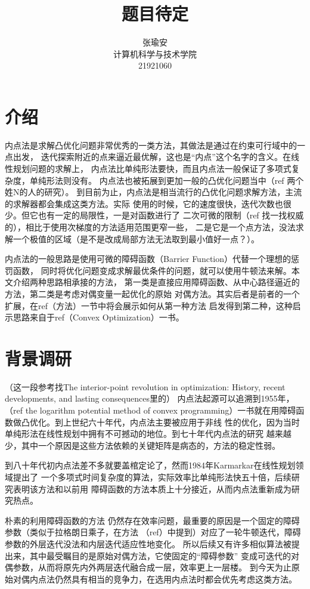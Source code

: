 \documentclass{article}
\title{题目待定}
\author{张瑜安\\ 计算机科学与技术学院 \\21921060}
\date{}
\begin{document}
\maketitle
\section{介绍}
内点法是求解凸优化问题非常优秀的一类方法，其做法是通过在约束可行域中的一点出发，
迭代探索附近的点来逼近最优解，这也是“内点”这个名字的含义。在线性规划问题的求解上，
内点法比单纯形法要快，而且内点法一般保证了多项式复杂度，单纯形法则没有。
内点法也被拓展到更加一般的凸优化问题当中（ref 两个姓N的人的研究）。
到目前为止，内点法是相当流行的凸优化问题求解方法，主流的求解器都会集成这类方法。实际
使用的时候，它的速度很快，迭代次数也很少。但它也有一定的局限性，一是对函数进行了
二次可微的限制（ref 找一找权威的），相比于使用次梯度的方法适用范围更窄一些，
二是它是一个点方法，没法求解一个极值的区域（是不是改成局部方法无法取到最小值好一点？）。

内点法的一般思路是使用可微的障碍函数（Barrier Function）代替一个理想的惩罚函数，
同时将优化问题变成求解最优条件的问题，就可以使用牛顿法来解。本文介绍两种思路相承接的方法，
第一类是直接应用障碍函数、从中心路径逼近的方法，第二类是考虑对偶变量一起优化的原始
对偶方法。其实后者是前者的一个扩展，在ref（方法）一节中将会展示如何从第一种方法
启发得到第二种，这种启示思路来自于ref（Convex Optimization）一书。


\section{背景调研}
（这一段参考找The interior-point revolution in optimization: History, recent developments, and lasting consequences里的）
内点法起源可以追溯到1955年，（ref the logarithm potential method of convex 
programming）一书就在用障碍函数做凸优化。到上世纪六十年代，内点法主要被应用于非线
性的优化，因为当时单纯形法在线性规划中拥有不可撼动的地位。到七十年代内点法的研究
越来越少，其中一个原因是这些方法依赖的关键矩阵是病态的，方法的稳定性弱。

到八十年代初内点法差不多就要盖棺定论了，然而1984年Karmarkar在线性规划领域提出了
一个多项式时间复杂度的算法，实际效率比单纯形法快五十倍，后续研究表明该方法和以前用
障碍函数的方法本质上十分接近，从而内点法重新成为研究热点。

朴素的利用障碍函数的方法
仍然存在效率问题，最重要的原因是一个固定的障碍参数（类似于拉格朗日乘子，在方法
（ref）中提到）对应了一轮牛顿迭代，障碍参数的外层迭代没法和内层迭代适应性地变化。
所以后续又有许多相似算法被提出来，其中最受瞩目的是原始对偶方法，它使固定的“障碍参数”
变成可迭代的对偶参数，从而将原先内外两层迭代融合成一层，效率更上一层楼。
到今天为止原始对偶内点法仍然具有相当的竞争力，在选用内点法时都会优先考虑这类方法。
\end{document}

